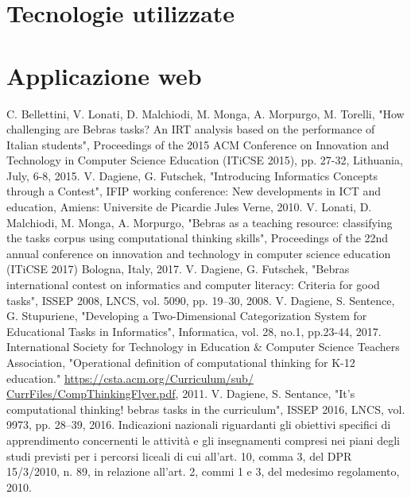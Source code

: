 \documentclass[12pt]{report}
\begin{document}
\section{Tecnologie utilizzate}
\section{Applicazione web}


%
\begin{thebibliography}{00}
%
C. Bellettini, V. Lonati, D. Malchiodi, M. Monga, A. Morpurgo, M. Torelli, 
"How challenging are Bebras tasks? An IRT analysis based on the performance of Italian students", 
Proceedings of the 2015 ACM Conference on Innovation and Technology in Computer Science Education (ITiCSE 2015), 
pp. 27-32, 
Lithuania, 
July, 6-8, 
2015.
%
V. Dagiene, G. Futschek, 
"Introducing Informatics Concepts through a Contest", 
IFIP working conference: New developments in ICT and education, 
Amiens: Universite de Picardie Jules Verne, 
2010.
%
V. Lonati, D. Malchiodi, M. Monga, A. Morpurgo, 
"Bebras as a teaching resource: classifying the tasks corpus using computational thinking skills", 
Proceedings of the 22nd annual conference on innovation and technology in computer science education (ITiCSE 2017) 
Bologna, Italy, 
2017.
%
V. Dagiene, G. Futschek, 
"Bebras international contest on informatics and computer literacy: Criteria for good tasks", 
ISSEP 2008, 
LNCS, vol. 5090, 
pp. 19–30, 
2008.
%
V. Dagiene, S. Sentence, G. Stupuriene, 
"Developing a Two-Dimensional Categorization System for Educational Tasks in Informatics", 
Informatica, vol. 28, no.1, 
pp.23-44, 
2017.
%
International Society for Technology in Education \& Computer Science Teachers Association, 
"Operational definition of computational thinking for K-12 education."
\url{https://csta.acm.org/Curriculum/sub/ CurrFiles/CompThinkingFlyer.pdf}, 
2011.
%
V. Dagiene, S. Sentance, 
"It’s computational thinking! bebras tasks in the curriculum", 
ISSEP 2016, 
LNCS, vol. 9973, 
pp. 28–39, 
2016.
%
Indicazioni nazionali riguardanti gli obiettivi specifici di apprendimento concernenti le attività e gli insegnamenti compresi nei piani degli studi previsti per i percorsi liceali di cui all'art. 10, comma 3, del DPR 15/3/2010, n. 89, in relazione all'art. 2, commi 1 e 3, del medesimo regolamento, 2010.

\end{thebibliography}
\end{document}
